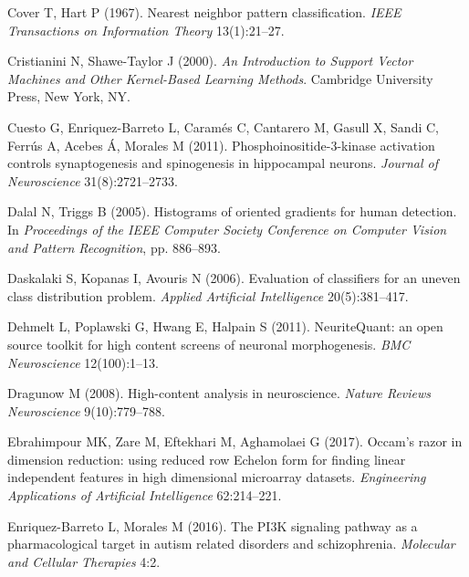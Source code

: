 \begin{thebibliography}{110}
Cover T, Hart P (1967). Nearest neighbor pattern classification. \emph{IEEE
  Transactions on Information Theory} 13(1):21--27.

Cristianini N, Shawe-Taylor J (2000). \emph{An Introduction to Support Vector
  Machines and Other Kernel-Based Learning Methods}. Cambridge University
  Press, New York, NY.

Cuesto G, Enriquez-Barreto L, Caram{\'e}s C, Cantarero M, Gasull X, Sandi C,
  Ferr{\'u}s A, Acebes {\'A}, Morales M (2011). Phosphoinositide-3-kinase
  activation controls synaptogenesis and spinogenesis in hippocampal neurons.
  \emph{Journal of Neuroscience} 31(8):2721--2733.

{\color{red}Dalal N, Triggs B (2005). Histograms of oriented gradients for human detection.
  In \emph{Proceedings of the IEEE Computer Society Conference on Computer
  Vision and Pattern Recognition}, pp. 886--893.}

Daskalaki S, Kopanas I, Avouris N (2006). Evaluation of classifiers for an
  uneven class distribution problem. \emph{Applied Artificial Intelligence}
  20(5):381--417.

Dehmelt L, Poplawski G, Hwang E, Halpain S (2011). {NeuriteQuant}: an open
  source toolkit for high content screens of neuronal morphogenesis. \emph{BMC
  Neuroscience} 12(100):1--13.

Dragunow M (2008). High-content analysis in neuroscience. \emph{Nature Reviews
  Neuroscience} 9(10):779--788.

Ebrahimpour MK, Zare M, Eftekhari M, Aghamolaei G (2017). Occam's razor in
  dimension reduction: using reduced row {Echelon} form for finding linear
  independent features in high dimensional microarray datasets.
  \emph{Engineering Applications of Artificial Intelligence} 62:214--221.

Enriquez-Barreto L, Morales M (2016). The {PI3K} signaling pathway as a
  pharmacological target in autism related disorders and schizophrenia.
  \emph{Molecular and Cellular Therapies} 4:2.


\end{thebibliography}
